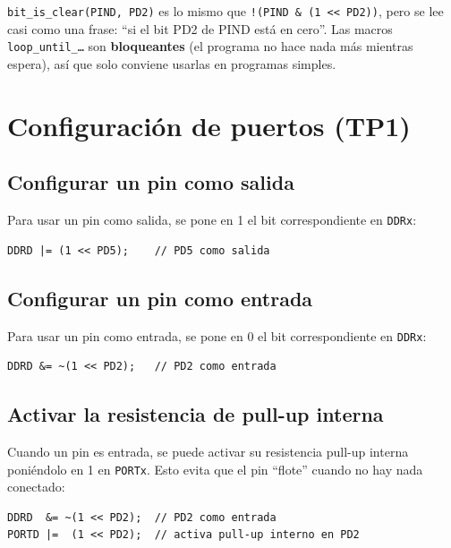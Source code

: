 \begin{notabox}
\texttt{bit\_is\_clear(PIND, PD2)} es lo mismo que \texttt{!(PIND \& (1 <{}< PD2))}, pero se
lee casi como una frase: ``si el bit PD2 de PIND está en cero''. Las macros
\texttt{loop\_until\_\ldots} son \textbf{bloqueantes} (el programa no hace nada más
mientras espera), así que solo conviene usarlas en programas simples.
\end{notabox}

\section{Configuración de puertos (TP1)}

\subsection{Configurar un pin como salida}

Para usar un pin como salida, se pone en 1 el bit correspondiente en \texttt{DDRx}:

\begin{lstlisting}[style=estilo-c]
DDRD |= (1 << PD5);    // PD5 como salida
\end{lstlisting}

\subsection{Configurar un pin como entrada}

Para usar un pin como entrada, se pone en 0 el bit correspondiente en \texttt{DDRx}:

\begin{lstlisting}[style=estilo-c]
DDRD &= ~(1 << PD2);   // PD2 como entrada
\end{lstlisting}

\subsection{Activar la resistencia de pull-up interna}

Cuando un pin es entrada, se puede activar su resistencia pull-up interna
poniéndolo en 1 en \texttt{PORTx}. Esto evita que el pin ``flote'' cuando no hay
nada conectado:

\begin{lstlisting}[style=estilo-c]
DDRD  &= ~(1 << PD2);  // PD2 como entrada
PORTD |=  (1 << PD2);  // activa pull-up interno en PD2
\end{lstlisting}

